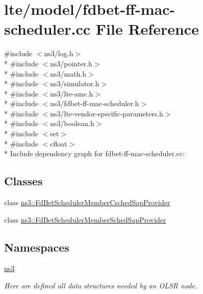 \hypertarget{fdbet-ff-mac-scheduler_8cc}{}\section{lte/model/fdbet-\/ff-\/mac-\/scheduler.cc File Reference}
\label{fdbet-ff-mac-scheduler_8cc}
{\ttfamily \#include $<$ns3/log.\+h$>$}\\*
{\ttfamily \#include $<$ns3/pointer.\+h$>$}\\*
{\ttfamily \#include $<$ns3/math.\+h$>$}\\*
{\ttfamily \#include $<$ns3/simulator.\+h$>$}\\*
{\ttfamily \#include $<$ns3/lte-\/amc.\+h$>$}\\*
{\ttfamily \#include $<$ns3/fdbet-\/ff-\/mac-\/scheduler.\+h$>$}\\*
{\ttfamily \#include $<$ns3/lte-\/vendor-\/specific-\/parameters.\+h$>$}\\*
{\ttfamily \#include $<$ns3/boolean.\+h$>$}\\*
{\ttfamily \#include $<$set$>$}\\*
{\ttfamily \#include $<$cfloat$>$}\\*
Include dependency graph for fdbet-\/ff-\/mac-\/scheduler.cc\+:
\subsection*{Classes}
\begin{DoxyCompactItemize}
\item 
class \hyperlink{classns3_1_1FdBetSchedulerMemberCschedSapProvider}{ns3\+::\+Fd\+Bet\+Scheduler\+Member\+Csched\+Sap\+Provider}
\item 
class \hyperlink{classns3_1_1FdBetSchedulerMemberSchedSapProvider}{ns3\+::\+Fd\+Bet\+Scheduler\+Member\+Sched\+Sap\+Provider}
\end{DoxyCompactItemize}
\subsection*{Namespaces}
\begin{DoxyCompactItemize}
\item 
 \hyperlink{namespacens3}{ns3}
\begin{DoxyCompactList}\small\item\em Here are defined all data structures needed by an O\+L\+SR node. \end{DoxyCompactList}\end{DoxyCompactItemize}
